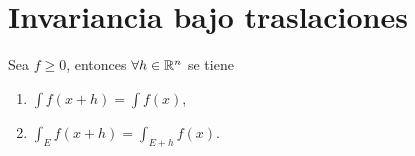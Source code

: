                     \section{ Invariancia bajo traslaciones }
                    
                    \begin{teorema}{}
                Sea $f\geq 0$, entonces $\forall h \in \mathbb{R}^n$ se tiene
                \begin{enumerate}
                    \item \label{it:invariancia-f-x+h} $\int f(x+h) =\int f(x)$,
                    \item \label{it:invariancia-f-y-E-x+h} $\int_E f(x+h) =\int_{E+h} f(x)$.
                \end{enumerate}
                    \end{teorema}
                    
